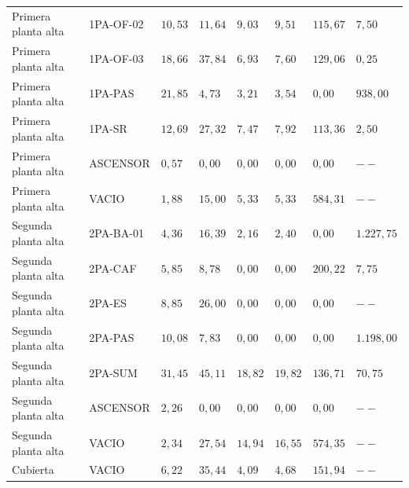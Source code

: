 {\begin{longtable}{p{2.5cm}p{1.8cm}p{1.3cm}p{1.5cm}p{1.5cm}p{1.5cm}p{1.6cm}p{1.6cm}}
  Primera planta alta & 1PA-OF-02 & $10,53$ & $11,64$ & $9,03$ & $9,51$ & $115,67$ & $7,50$ \\
  Primera planta alta & 1PA-OF-03 & $18,66$ & $37,84$ & $6,93$ & $7,60$ & $129,06$ & $0,25$ \\
  Primera planta alta & 1PA-PAS & $21,85$ & $4,73$ & $3,21$ & $3,54$ & $0,00$ & $938,00$ \\
  Primera planta alta & 1PA-SR & $12,69$ & $27,32$ & $7,47$ & $7,92$ & $113,36$ & $2,50$ \\
  Primera planta alta & ASCENSOR & $0,57$ & $0,00$ & $0,00$ & $0,00$ & $0,00$ & $--$ \\
  Primera planta alta & VACIO & $1,88$ & $15,00$ & $5,33$ & $5,33$ & $584,31$ & $--$ \\
  Segunda planta alta & 2PA-BA-01 & $4,36$ & $16,39$ & $2,16$ & $2,40$ & $0,00$ & $1.227,75$ \\
  Segunda planta alta & 2PA-CAF & $5,85$ & $8,78$ & $0,00$ & $0,00$ & $200,22$ & $7,75$ \\
  Segunda planta alta & 2PA-ES & $8,85$ & $26,00$ & $0,00$ & $0,00$ & $0,00$ & $--$ \\
  Segunda planta alta & 2PA-PAS & $10,08$ & $7,83$ & $0,00$ & $0,00$ & $0,00$ & $1.198,00$ \\
  Segunda planta alta & 2PA-SUM & $31,45$ & $45,11$ & $18,82$ & $19,82$ & $136,71$ & $70,75$ \\
  Segunda planta alta & ASCENSOR & $2,26$ & $0,00$ & $0,00$ & $0,00$ & $0,00$ & $--$ \\
  Segunda planta alta & VACIO & $2,34$ & $27,54$ & $14,94$ & $16,55$ & $574,35$ & $--$ \\
  Cubierta & VACIO & $6,22$ & $35,44$ & $4,09$ & $4,68$ & $151,94$ & $--$ \\
\end{longtable}
}

